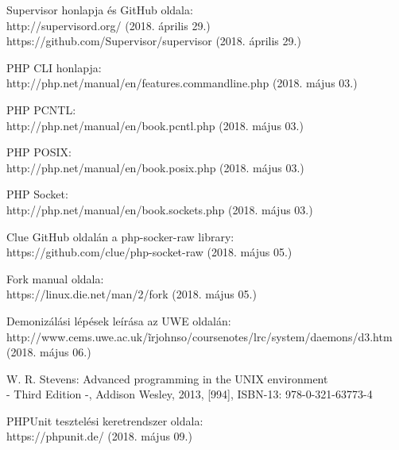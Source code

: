 \documentclass[12pt]{report}
\begin{document}
\begin{thebibliography}{20}

  Supervisor honlapja és GitHub oldala: \\
   \hspace*{3mm}http://supervisord.org/  (2018. április 29.)\\
  \hspace*{3mm}https://github.com/Supervisor/supervisor (2018. április 29.)

  PHP CLI honlapja: \\
   \hspace*{3mm}http://php.net/manual/en/features.commandline.php  (2018. május 03.)
   
   PHP PCNTL: \\
   \hspace*{3mm}http://php.net/manual/en/book.pcntl.php  (2018. május 03.)
   
   PHP POSIX: \\
   \hspace*{3mm}http://php.net/manual/en/book.posix.php  (2018. május 03.)
   
   PHP Socket: \\
   \hspace*{3mm}http://php.net/manual/en/book.sockets.php  (2018. május 03.)
   
	Clue GitHub oldalán a php-socker-raw library: \\
	\hspace*{3mm}https://github.com/clue/php-socket-raw  (2018. május 05.)
    
	Fork manual oldala: \\
	\hspace*{3mm} https://linux.die.net/man/2/fork  (2018. május 05.)
    
	Demonizálási lépések leírása az UWE oldalán: \\
	\hspace*{3mm} http://www.cems.uwe.ac.uk/\~irjohnso/coursenotes/lrc/system/daemons/d3.htm  (2018. május 06.)
    
	W. R. Stevens: Advanced programming in the UNIX environment \\
    - Third Edition -, Addison Wesley, 2013, [994], ISBN-13: 978-0-321-63773-4 
    
	PHPUnit tesztelési keretrendszer oldala: \\
	\hspace*{3mm}https://phpunit.de/  (2018. május 09.)
    
\end{thebibliography}
\end{document}
